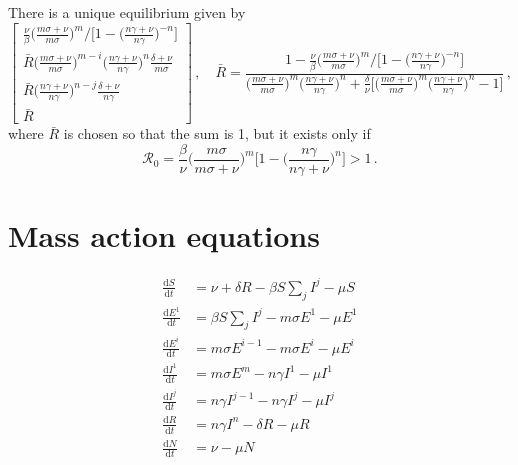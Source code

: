 \documentclass[fleqn]{article}
\begin{document}
There is a unique equilibrium given by
\begin{equation}
\begin{bmatrix}
  \frac{\nu}{\beta} \big(\frac{m \sigma + \nu}{m \sigma}\big)^{m} \big/ \big[1 - \big(\frac{n \gamma + \nu}{n \gamma}\big)^{-n}\big] \\
  \bar{R} \big(\frac{m \sigma + \nu}{m \sigma}\big)^{m - i} \big(\frac{n \gamma + \nu}{n \gamma}\big)^{n} \frac{\delta + \nu}{m \sigma} \\
  \bar{R} \big(\frac{n \gamma + \nu}{n \gamma}\big)^{n - j} \frac{\delta + \nu}{n \gamma} \\
  \bar{R}
\end{bmatrix}
\,,\quad
\bar{R} = \frac{1 - \frac{\nu}{\beta} \big(\frac{m \sigma + \nu}{m \sigma}\big)^{m} \big/ \big[1 - \big(\frac{n \gamma + \nu}{n \gamma}\big)^{-n}\big]}{\big(\frac{m \sigma + \nu}{m \sigma}\big)^{m} \big(\frac{n \gamma + \nu}{n \gamma}\big)^{n} + \frac{\delta}{\nu} \big[\big(\frac{m \sigma + \nu}{m \sigma}\big)^{m} \big(\frac{n \gamma + \nu}{n \gamma}\big)^{n} - 1\big]}\,,
\end{equation}
where $\bar{R}$ is chosen so that the sum is 1, but it exists only if
\begin{equation}
\mathcal{R}_{0} = \frac{\beta}{\nu} \Big(\frac{m \sigma}{m \sigma + \nu}\Big)^{m} \Big[1 - \Big(\frac{n \gamma}{n \gamma + \nu}\Big)^{n}\Big] > 1\,.
\end{equation}
\clearpage


\section{Mass action equations}

\begin{subequations}
\begin{align}
  \frac{\text{d} S    }{\text{d} t}
  &= \nu + \delta R - \beta S \sum\nolimits_{j} I^{j} - \mu S \\
  \frac{\text{d} E^{1}}{\text{d} t}
  &= \beta S \sum\nolimits_{j} I^{j} - m \sigma E^{1} - \mu E^{1} \\
  \frac{\text{d} E^{i}}{\text{d} t}
  &= m \sigma E^{i-1} - m \sigma E^{i} - \mu E^{i} \\
  \frac{\text{d} I^{1}}{\text{d} t}
  &= m \sigma E^{m} - n \gamma I^{1} - \mu I^{1} \\
  \frac{\text{d} I^{j}}{\text{d} t}
  &= n \gamma I^{j-1} - n \gamma I^{j} - \mu I^{j} \\
  \frac{\text{d} R    }{\text{d} t}
  &= n \gamma I^{n} - \delta R - \mu R \\
  \frac{\text{d} N    }{\text{d} t}
  &= \nu - \mu N
\end{align}
\end{subequations}
\end{document}
